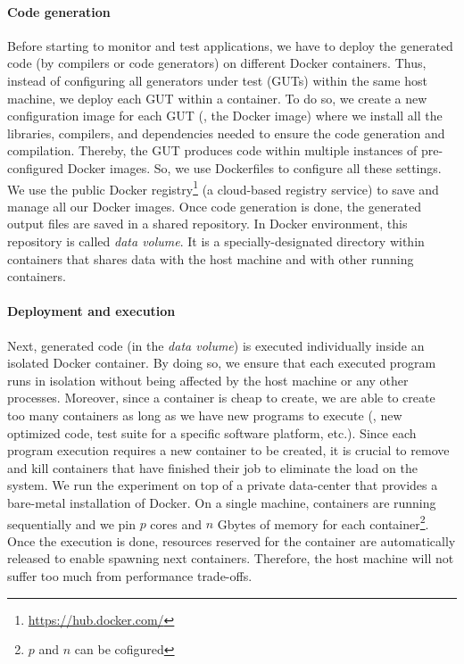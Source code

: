 \paragraph{Code generation}
Before starting to monitor and test applications, we have to deploy the generated code (by compilers or code generators) on different Docker containers. 
Thus, instead of configuring all generators under test (GUTs) within the same host machine, we deploy each GUT within a container. To do so, we create a new configuration image for each GUT (\ie, the Docker image) where we install all the libraries, compilers, and dependencies needed to ensure the code generation and compilation. Thereby, the GUT produces code within multiple instances of pre-configured Docker images. So, we use Dockerfiles to configure all these settings.
We use the public Docker registry\footnote{\url{https://hub.docker.com/}} (a cloud-based registry service) to save and manage all our Docker images. 
Once code generation is done, the generated output files are saved in a shared repository. In Docker environment, this repository is called \textit{data volume}. It is a specially-designated directory within containers that shares data with the host machine and with other running containers.
 
\paragraph{Deployment and execution}
Next, generated code (in the \textit{data volume}) is executed individually inside an isolated Docker container. By doing so, we ensure that each executed program runs in isolation without being affected by the host machine or any other processes. Moreover, since a container is cheap to create, we are able to create too many containers as long as we have new programs to execute (\eg, new optimized code, test suite for a specific software platform, etc.).
Since each program execution requires a new container to be created, it is crucial to remove and kill containers that have finished their job to eliminate the load on the system. We run the experiment on top of a private data-center that provides a bare-metal installation of Docker. On a single machine, containers are running sequentially and we pin $p$ cores and $n$ Gbytes of memory for each container\footnote{$p$ and $n$ can be cofigured}. Once the execution is done, resources reserved for the container are automatically released to enable spawning next containers. Therefore, the host machine will not suffer too much from performance trade-offs.


